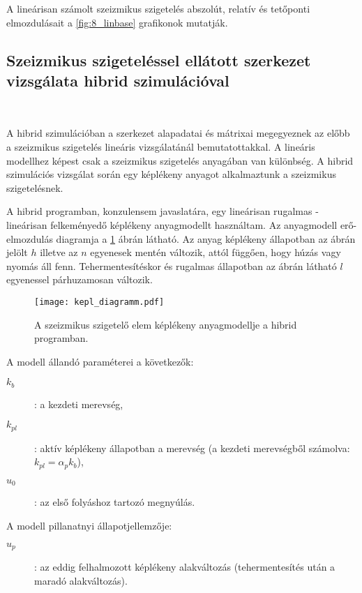 

A lineárisan számolt szeizmikus szigetelés abszolút, relatív és tetőponti elmozdulásait a \ref{fig:8_linbase} grafikonok mutatják.


\subsection{ Szeizmikus szigeteléssel ellátott szerkezet vizsgálata hibrid szimulációval}

{\ }

A hibrid szimulációban a szerkezet alapadatai és  mátrixai megegyeznek az előbb a szeizmikus szigetelés lineáris vizsgálatánál bemutatottakkal. A lineáris modellhez képest csak a szeizmikus szigetelés anyagában van különbség. A hibrid szimulációs vizsgálat során egy képlékeny anyagot alkalmaztunk a szeizmikus szigetelésnek.

A hibrid programban, konzulensem javaslatára, egy lineárisan rugalmas - lineárisan felkeményedő képlékeny anyagmodellt használtam. Az anyagmodell erő-elmozdulás diagramja a \ref{fig:kepl} ábrán látható. Az  anyag képlékeny állapotban az ábrán jelölt $h$ illetve az $n$ egyenesek mentén változik, attól függően, hogy húzás vagy nyomás áll fenn. Tehermentesítéskor és rugalmas állapotban az ábrán látható $l$ egyenessel párhuzamosan változik. 

\begin{figure}[h!]
\centering
\texttt{[image: kepl\_diagramm.pdf]}
\caption{A szeizmikus szigetelő elem  képlékeny anyagmodellje a hibrid programban.}
\label{fig:kepl}
\end{figure}

A modell állandó paraméterei a következők:
\begin{description}
\item  [$k_b$]: a kezdeti merevség,
\item  [$k_{pl}$]: aktív képlékeny állapotban a merevség (a kezdeti merevségből számolva: $k_{pl} = \alpha_pk_b$),
\item  [$u_0$]: az első folyáshoz tartozó megnyúlás.
\end{description}
A modell pillanatnyi állapotjellemzője:
\begin{description}
\item  [$u_p$]: az eddig felhalmozott képlékeny alakváltozás (tehermentesítés után a maradó alakváltozás).
\end{description}

